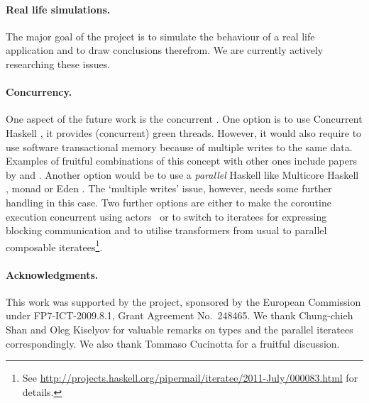 \paragraph{Real life simulations.}
The major goal of the project is to simulate the behaviour of a real life application and to draw conclusions therefrom.
We are currently actively researching these issues.

\paragraph{Concurrency.}
One aspect of the future work is the concurrent \soosim.
One option is to use Concurrent Haskell \cite{ConcHs}, it provides (concurrent) green threads.
However, it would also require to use software transactional memory \cite{springerlink:10.1007/s004460050028} because of multiple writes to the same data.
Examples of fruitful combinations of this concept with other ones include papers by \citeauthor{Harris:2008:CMT:1378704.1378725} \cite{Harris:2008:CMT:1378704.1378725} and \citeauthor{Bieniusa:2010:BAA:1835698.1835714} \cite{Bieniusa:2010:BAA:1835698.1835714,springerlink:10.1007/978-3-642-25959-3_2}.
Another option would be to use a \emph{parallel} Haskell like Multicore Haskell \cite{marlow:rsm},  monad \cite{par-monad} or Eden \cite{eden}.
The `multiple writes' issue, however, needs some further handling in this case.
Two further options are either to make the coroutine execution concurrent using actors~\cite{Hewitt:1973:UMA:1624775.1624804,sulzmann2008actors} or to switch to iteratees for expressing blocking communication and to utilise transformers from usual to parallel composable iteratees\footnote{See \url{http://projects.haskell.org/pipermail/iteratee/2011-July/000083.html} for details.}.

%

\paragraph{Acknowledgments.}
This work was supported by the \soos project, sponsored by the European Commission under FP7-ICT-2009.8.1, Grant Agreement No.~248465.
We thank Chung-chieh Shan and Oleg Kiselyov for valuable remarks on
 types and the parallel iteratees correspondingly.
We also thank Tommaso Cucinotta for a fruitful discussion.

